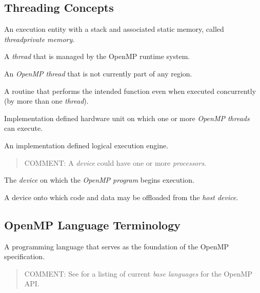 \subsection{Threading Concepts}
\label{subsec:Threading Concepts}
\glossarydefstart
An execution entity with a stack and associated static memory, called 
\emph{threadprivate memory}.
\glossarydefend

\glossarydefstart
A \emph{thread} that is managed by the OpenMP runtime system.
\glossarydefend

\glossarydefstart
An \emph{OpenMP thread} that is not currently part of any  region. 
\glossarydefend

\glossarydefstart
A routine that performs the intended function even when executed concurrently 
(by more than one \emph{thread}).
\glossarydefend

\glossarydefstart
Implementation defined hardware unit on which one or more \emph{OpenMP threads} can 
execute.
\glossarydefend

\glossarydefstart
An implementation defined logical execution engine.

\begin{quote}
COMMENT: A \emph{device} could have one or more \emph{processors}.
\end{quote}
\glossarydefend

\glossarydefstart
The \emph{device} on which the \emph{OpenMP program} begins execution.
\glossarydefend

\glossarydefstart
A device onto which code and data may be offloaded from the \emph{host device}.
\glossarydefend





\subsection{OpenMP Language Terminology}
\label{subsec:OpenMP Language Terminology}
\glossarydefstart
A programming language that serves as the foundation of the OpenMP 
specification.

\begin{quote}
COMMENT: See 
for a listing of current \emph{base languages} for the OpenMP API.
\end{quote}
\glossarydefend

